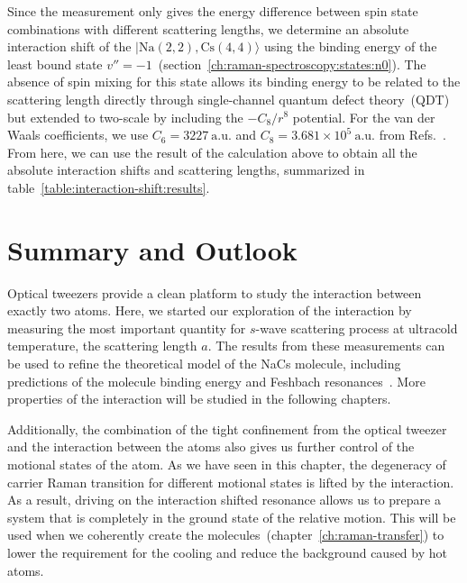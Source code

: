 Since the measurement only gives the energy difference
between spin state combinations with different scattering lengths,
we determine an absolute interaction shift of the $|\mathrm{Na(2, 2),Cs(4, 4)}\rangle$
using the binding energy of
the least bound state $v''=-1$~(section~\ref{ch:raman-spectroscopy:states:n0}).
The absence of spin mixing for this state allows its binding energy to be related
to the scattering length directly through
single-channel quantum defect theory~(QDT)~\cite{
  gao_quantum-defect_1998,gao_angular-momentum-insensitive_2001,gao_general_2008}
but extended to two-scale by including the $-C_8/r^8$ potential.
For the van der Waals coefficients, we use $C_6=3227~\mathrm{a.u.}$ and
$C_8=3.681\times10^5~\mathrm{a.u.}$ from
Refs.~\cite{docenko_coupling_2006,mcguyer_high-precision_2015,porsev_accurate_2003}.
From here, we can use the result of the calculation above to obtain all the
absolute interaction shifts and scattering lengths,
summarized in table~\ref{table:interaction-shift:results}.

\section{Summary and Outlook}
\label{ch:interaction-shift:summary}
Optical tweezers provide a clean platform to study the interaction between exactly two atoms.
Here, we started our exploration of the interaction by measuring the most important quantity
for $s$-wave scattering process at ultracold temperature, the scattering length $a$.
The results from these measurements can be used
to refine the theoretical model of the NaCs molecule,
including predictions of the molecule binding energy
and Feshbach resonances~\cite{hood_multichannel_2020}.
More properties of the interaction will be studied in the following chapters.

Additionally, the combination of the tight confinement from the optical tweezer
and the interaction between the atoms also gives us further control
of the motional states of the atom.
As we have seen in this chapter, the degeneracy of carrier Raman transition
for different motional states is lifted by the interaction.
As a result, driving on the interaction shifted resonance
allows us to prepare a system that is completely in the ground state of the relative motion.
This will be used when we coherently create the molecules~(chapter~\ref{ch:raman-transfer})
to lower the requirement for the cooling and reduce the background caused by hot atoms.
